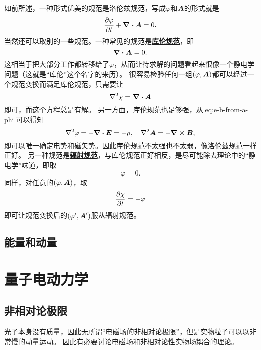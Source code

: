 \documentclass[UTF8, a4paper]{ctexart}
\newcommand*{\concept}[1]{\underline{\textbf{#1}}}
\begin{document}
如前所述，一种形式优美的规范是洛伦兹规范，写成$\varphi$和$\vb*{A}$的形式就是
\begin{equation}
    \pdv{\varphi}{t} + \div{\vb*{A}} = 0.
\end{equation}
当然还可以取别的一些规范。一种常见的规范是\concept{库伦规范}，即
\begin{equation}
    \div{\vb*{A}} = 0.
\end{equation}
这相当于把大部分工作都转移给了$\varphi$，从而让待求解的问题看起来很像一个静电学问题（这就是“库伦”这个名字的来历）。
很容易检验任何一组$(\varphi, \vb*{A})$都可以经过一个规范变换而满足库伦规范，只需要让
\[
    \laplacian \chi = \div{\vb*{A}}
\]
即可，而这个方程总是有解。
另一方面，库伦规范也足够强，从\eqref{eq:e-b-from-a-phi}可以得知
\begin{equation}
    \laplacian \varphi = - \div{\vb*{E}} = - \rho, \quad \laplacian \vb*{A} = - \curl{\vb*{B}},
\end{equation}
即可以唯一确定电势和磁矢势。因此库伦规范不太强也不太弱，像洛伦兹规范一样正好。
另一种规范是\concept{辐射规范}，与库伦规范正好相反，是尽可能除去理论中的“静电学”味道，即取
\begin{equation}
    \varphi = 0.
\end{equation}
同样，对任意的$(\varphi, \vb*{A})$，取
\[
    \pdv{\chi}{t} = - \varphi
\]
即可让规范变换后的$(\varphi', \vb*{A}')$服从辐射规范。

\subsection{能量和动量}

\section{量子电动力学}\label{sec:qed}

\subsection{非相对论极限}

光子本身没有质量，因此无所谓“电磁场的非相对论极限”，但是实物粒子可以以非常慢的动量运动。
因此有必要讨论电磁场和非相对论性实物场耦合的理论。
\end{document}

